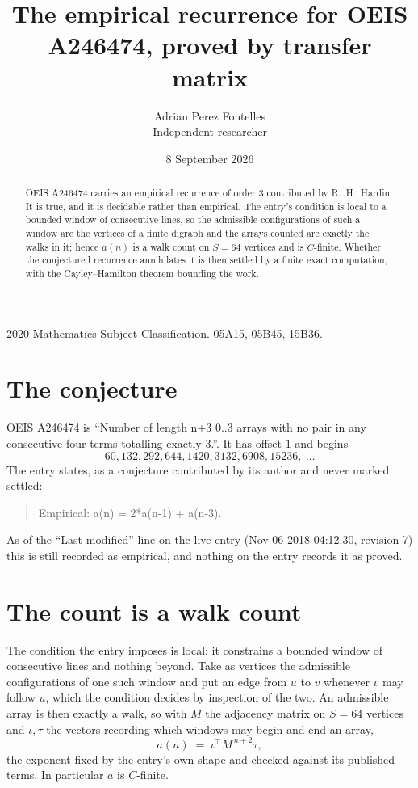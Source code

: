 \documentclass[11pt,a4paper]{article}
\title{The empirical recurrence for OEIS A246474, proved by transfer matrix}
\author{Adrian Perez Fontelles\\ \small Independent researcher}
\date{8 September 2026}
\theoremstyle{plain}
\theoremstyle{definition}
\begin{document}
\maketitle

\begin{abstract}
OEIS A246474 carries an empirical recurrence of order $3$ contributed by R.~H.~Hardin. It is
true, and it is decidable rather than empirical. The entry's condition is local to a bounded window of consecutive lines, so
the admissible configurations of such a window are the vertices of a finite digraph and the
arrays counted are exactly the walks in it; hence $a(n)$ is a walk count on $S=64$ vertices
and is $C$-finite. Whether the conjectured recurrence annihilates it is then settled by a
finite exact computation, with the Cayley--Hamilton theorem bounding the work.
\end{abstract}

\noindent\small 2020 Mathematics Subject Classification. 05A15, 05B45, 15B36.\normalsize

\section{The conjecture}

OEIS A246474 is ``Number of length n+3 0..3 arrays with no pair in any consecutive four terms totalling exactly 3.''. It has offset $1$ and begins
\[
60, 132, 292, 644, 1420, 3132, 6908, 15236,\ \dots
\]
The entry states, as a conjecture contributed by its author and never marked settled:
\begin{quote}
Empirical: a(n) = 2*a(n-1) + a(n-3).
\end{quote}
As of the ``Last modified'' line on the live entry (Nov 06 2018 04:12:30, revision 7) this is still
recorded as empirical, and nothing on the entry records it as proved.

\section{The count is a walk count}

The condition the entry imposes is local: it constrains a bounded window of consecutive lines and nothing beyond. Take as
vertices the admissible configurations of one such window and put an edge from $u$ to $v$
whenever $v$ may follow $u$, which the condition decides by inspection of the two. An
admissible array is then exactly a walk, so with $M$ the adjacency matrix on $S=64$ vertices
and $\iota,\tau$ the vectors recording which windows may begin and end an array,
\[
a(n)\;=\;\iota^{\!\top}M^{\,n+2}\tau ,
\]
the exponent fixed by the entry's own shape and checked against its published terms. In
particular $a$ is $C$-finite.
\end{document}
